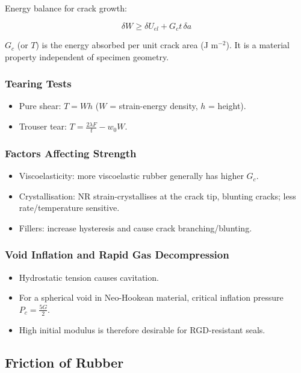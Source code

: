 \documentclass{NoteThesis/note-thesis}
\begin{document}
Energy balance for crack growth:

\[
\delta W \ge \delta U_{el} + G_c t\,\delta a
\]

$G_c$ (or $T$) is the energy absorbed per unit crack area (J m$^{-2}$). It is a material property independent of specimen geometry.

\subsubsection*{Tearing Tests}

\begin{itemize}
    \item Pure shear: $T = W h$ ($W$ = strain-energy density, $h$ = height).
    \item Trouser tear: $T = \frac{2\lambda F}{t} - w_0 W$.
\end{itemize}

\subsubsection*{Factors Affecting Strength}

\begin{itemize}
    \item Viscoelasticity: more viscoelastic rubber generally has higher $G_c$.
    \item Crystallisation: NR strain-crystallises at the crack tip, blunting cracks; less rate/temperature sensitive.
    \item Fillers: increase hysteresis and cause crack branching/blunting.
\end{itemize}

\subsubsection*{Void Inflation and Rapid Gas Decompression}

\begin{itemize}
    \item Hydrostatic tension causes cavitation.
    \item For a spherical void in Neo-Hookean material, critical inflation pressure $P_c = \frac{5G}{2}$.
    \item High initial modulus is therefore desirable for RGD-resistant seals.
\end{itemize}

\subsection{Friction of Rubber}
\end{document}
